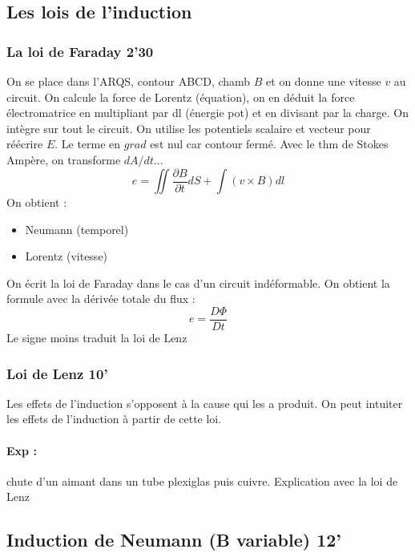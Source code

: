 \subsection{Les lois de l'induction}

\subsubsection{La loi de Faraday 2'30}

On se place dans l'ARQS, contour ABCD, chamb $B$ et on donne une vitesse $v$ au circuit.
On calcule la force de Lorentz (équation), on en déduit la force électromatrice en multipliant par dl (énergie pot) et en divisant par la charge.
On intègre sur tout le circuit.
On utilise les potentiels scalaire et vecteur pour réécrire $E$.
Le terme en $grad$ est nul car contour fermé.
Avec le thm de Stokes Ampère, on transforme $dA/dt$...
\begin{equation}
e = \iint \frac{\partial B}{\partial t} dS + \int (v\times B) dl
\end{equation}
On obtient :
\begin{itemize}
\item Neumann (temporel)
\item Lorentz (vitesse)
\end{itemize}

On écrit la loi de Faraday dans le cas d'un circuit indéformable.
On obtient la formule avec la dérivée totale du flux :
\begin{equation}
e = \frac{D\Phi}{Dt}
\end{equation}
Le signe moins traduit la loi de Lenz

\subsubsection{Loi de Lenz 10'}

Les effets de l'induction s'opposent à la cause qui les a produit.
On peut intuiter les effets de l'induction à partir de cette loi.

\paragraph{Exp : } chute d'un aimant dans un tube plexiglas puis cuivre.
Explication avec la loi de Lenz

\subsection{Induction de Neumann (B variable) 12'}

